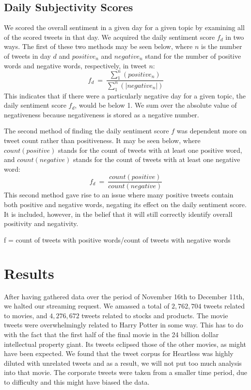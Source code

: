 \documentclass[11pt]{article}
\begin{document}
\subsection{Daily Subjectivity Scores}
We scored the overall sentiment in a given day for a given topic by examining all of the scored tweets in that day. We acquired the daily sentiment score $f_{d}$ in two ways. The first of these two methods may be seen below, where $n$ is the number of tweets in day $d$ and $positive_{n}$ and $negative_{n}$ stand for the number of positive words and negative words, respectively, in tweet $n$:
\begin{equation}
f_{d}\ =\ \frac{\sum_{1}^{n}(positive_{n})}{\sum_{1}^{n}(|negative_{n}|)}
\end{equation}
This indicates that if there were a particularly negative day for a given topic, the daily sentiment score $f_{d}$, would be below 1. We sum over the absolute value of negativeness because negativeness is stored as a negative number.

The second method of finding the daily sentiment score $f$ was dependent more on tweet count rather than positiveness. It may be seen below, where $count(positive)$ stands for the count of tweets with at least one positive word, and $count(negative)$ stands for the count of tweets with at least one negative word:
\begin{equation}
f_{d}\ =\ \frac{count(positive)}{count(negative)}
\end{equation}
This second method gave rise to an issue where many positive tweets contain both positive and negative words, negating its effect on the daily sentiment score. It is included, however, in the belief that it will still correctly identify overall positivity and negativity.

f = count of tweets with positive words/count of tweets with negative words

\section{Results}
After having gathered data over the period of November 16th to December 11th, we halted our streaming request. We amassed a total of $2,762,704$ tweets related to movies, and $4,276,672$ tweets related to stocks and products. The movie tweets were overwhelmingly related to Harry Potter in some way. This has to do with the fact that the first half of the final movie in the 24 billion dollar intellectual property giant. Its tweets eclipsed those of the other movies, as might have been expected. We found that the tweet corpus for Heartless was highly diluted with unrelated tweets and as a result, we will not put too much analysis into that movie. The corporate tweets were taken from a smaller time period, due to difficulty and this might have biased the data.
\end{document}
